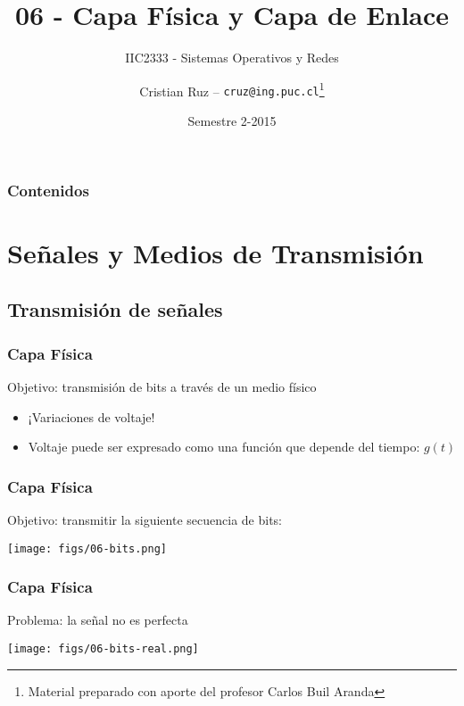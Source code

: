 \documentclass[letter]{beamer}
\title[IIC2333] %
{06 - Capa Física y Capa de Enlace}
\subtitle{IIC2333 - Sistemas Operativos y Redes}
\author[C.Ruz] %
{Cristian Ruz -- {\tt cruz@ing.puc.cl}\footnote{Material preparado con aporte del profesor Carlos Buil Aranda} }
\institute[PUC] %
{
  Departamento de Ciencia de la Computación\\
  Pontificia Universidad Católica de Chile
}
\date[2/2015] %
{Semestre 2-2015}
\begin{document}
\frame{\titlepage}

\begin{frame}
\frametitle{Contenidos}
\tableofcontents
\end{frame}


\section{Señales y Medios de Transmisión}

\subsection{Transmisión de señales}

\begin{frame}
  \frametitle{Capa Física}
  Objetivo: transmisión de bits a través de un medio físico
  
  
  \begin{itemize}
    \item<3->{¡Variaciones de voltaje!}
    \item<4->{Voltaje puede ser expresado como una función que depende del tiempo: $g(t)$}
  \end{itemize}

\end{frame}

\begin{frame}  
  \frametitle{Capa Física}

  Objetivo: transmitir la siguiente secuencia de bits:
  
  \begin{center}
    \texttt{[image: figs/06-bits.png]}
  \end{center}
\end{frame}


\begin{frame}  
  \frametitle{Capa Física}

  Problema: la señal no es perfecta
  
  \begin{center}
    \texttt{[image: figs/06-bits-real.png]}
  \end{center}
\end{frame}
\end{document}
